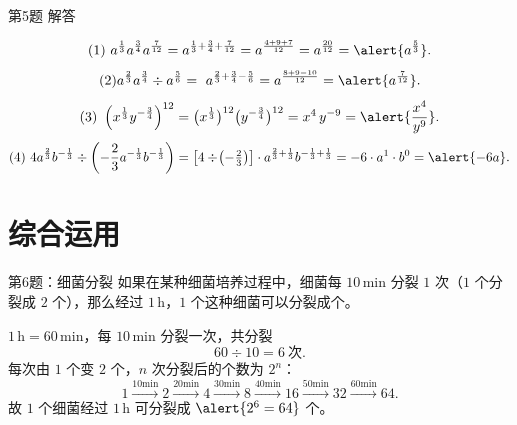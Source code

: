 \documentclass[10pt,aspectratio=169,serif,fleqn]{beamer}
\begin{document}
\begin{frame}[t]{第5题 解答}
\begin{tcolorbox}[colback=orange!10,colframe=orange,title=\textbf{解}]
\[
(1)\ a^{\frac{1}{3}}a^{\frac{3}{4}}a^{\frac{7}{12}}=a^{\frac13+\frac34+\frac{7}{12}}=a^{\frac{4+9+7}{12}}=a^{\frac{20}{12}}=\alert{a^{\frac53}}.
\]
\[
(2) a^{\frac{2}{3}}a^{\frac{3}{4}}\div a^{\frac{5}{6}}=\ a^{\frac23+\frac34-\frac56}=a^{\frac{8+9-10}{12}}=\alert{a^{\frac{7}{12}}}.
\]
\[
(3)\ \left(x^{\frac{1}{3}}y^{-\frac{3}{4}}\right)^{12}=
\bigl(x^{\frac13}\bigr)^{12}\bigl(y^{-\frac34}\bigr)^{12}=x^{4}\,y^{-9}=\alert{\dfrac{x^{4}}{y^{9}}}.
\]
\[
(4)\ 4a^{\frac{2}{3}}b^{-\frac{1}{3}}\div\left(-\frac{2}{3}a^{-\frac{1}{3}}b^{-\frac{1}{3}}\right)
=\left[4\div\!\left(-\tfrac23\right)\right]\cdot a^{\frac23+\frac13}b^{-\frac13+\frac13}
= -6\cdot a^{1}\cdot b^{0}=\alert{-6a}.
\]
\end{tcolorbox}
\end{frame}

\section{综合运用}
\begin{frame}[t]{第6题：细菌分裂}\vspace{-1.5em}
 如果在某种细菌培养过程中，细菌每 $10\,\text{min}$ 分裂 $1$ 次（$1$ 个分裂成 $2$ 个），那么经过 $1\,\text{h}$，$1$ 个这种细菌可以分裂成\underline{\hspace{2em}}个。

\begin{tcolorbox}[colback=orange!10,colframe=orange,title=\textbf{解}]
	$1\,\text{h}=60\,\text{min}$，每 $10\,\text{min}$ 分裂一次，共分裂
	\[
	60\div 10=6\ \text{次}.
	\]
	每次由 $1$ 个变 $2$ 个，$n$ 次分裂后的个数为 $2^{n}$：
	\[
	1\overset{10\text{min}}{\longrightarrow}2
	\overset{20\text{min}}{\longrightarrow}4
	\overset{30\text{min}}{\longrightarrow}8
	\overset{40\text{min}}{\longrightarrow}16
	\overset{50\text{min}}{\longrightarrow}32
	\overset{60\text{min}}{\longrightarrow}64.
	\]
	故 $1$ 个细菌经过 $1\,\text{h}$ 可分裂成 $\alert{2^{6}=64}$ 个。
\end{tcolorbox}
\end{frame}
\end{document}

